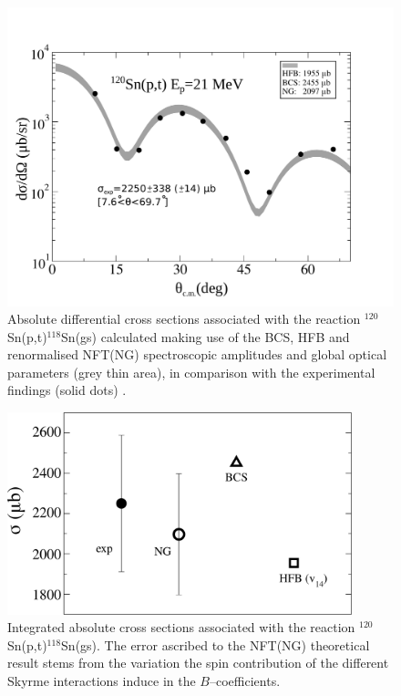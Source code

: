   \begin{figure}
  \centerline{\includegraphics*[width=12cm,angle=0]{C8/figsC8/Fig2_v2}}
  	\caption{Absolute differential  cross sections associated with the reaction
  	$^{120}$Sn(p,t)$^{118}$Sn(gs) calculated making use of the BCS, HFB and renormalised NFT(NG) spectroscopic 
  	amplitudes and global optical parameters (grey thin area), in comparison with the experimental findings (solid dots) \cite{Guazzoni:08}.}\label{fig6.4.2}
  \end{figure}
  \begin{figure}
  \centerline{\includegraphics*[width=10cm,angle=0]{C8/figsC8/fig5_v2}}
  	\caption{Integrated absolute  cross sections associated with the reaction
  	$^{120}$Sn(p,t)$^{118}$Sn(gs). The error ascribed  to
  	the NFT(NG) theoretical result stems from the variation the spin contribution of the different Skyrme interactions induce in the $B$--coefficients.}\label{fig6.4.3}
  \end{figure}
  
